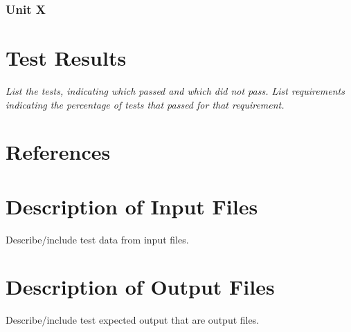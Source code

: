 \documentclass[12pt]{article}
\newcounter{req ID}
\begin{document}
\subsubsection{Unit X}

\section{Test Results}

{\it
List the tests, indicating which passed and which did not pass.
List requirements indicating the percentage of tests that passed for that requirement.
}

\section{References}

\appendix

\section{Description of Input Files}

Describe/include test data from input files.

\section{Description of Output Files}

Describe/include test expected output that are output files.
\end{document}

